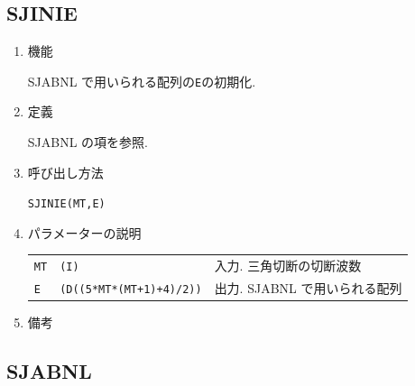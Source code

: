 \documentclass[a4j]{jarticle}
\begin{document}

\subsection{SJINIE}

\begin{enumerate}

\item 機能 

SJABNL で用いられる配列の{\tt E}の初期化.

\item 定義

SJABNL の項を参照.

\item 呼び出し方法 

{\tt SJINIE(MT,E)}
  
\item パラメーターの説明

\begin{tabular}{lll}
{\tt MT} & {\tt (I)} & 入力. 三角切断の切断波数\\
{\tt E} & {\tt (D((5*MT*(MT+1)+4)/2))} & 出力. SJABNL で用いられる配列
\end{tabular}

\item 備考
    
\end{enumerate}


\subsection{SJABNL}
\end{document}
